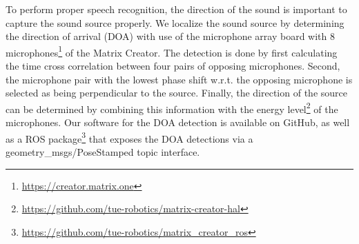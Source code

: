 To perform proper speech recognition, the direction of the sound is important to capture the sound source properly. We localize the sound source by determining the direction of arrival (DOA) with use of the microphone array board with 8 microphones\footnote{\url{https://creator.matrix.one}} of the Matrix Creator.
The detection is done by first calculating the time cross correlation between four pairs of opposing microphones. Second, the microphone pair with the lowest phase shift w.r.t. the opposing microphone is selected as being perpendicular to the source. Finally, the direction of the source can be determined by combining this information with the energy level\footnote{\url{https://github.com/tue-robotics/matrix-creator-hal}} of the microphones. Our software for the DOA detection is available on GitHub, as well as a ROS package\footnote{\url{https://github.com/tue-robotics/matrix_creator_ros}} that exposes the DOA detections via a geometry\_msgs/PoseStamped topic interface. 